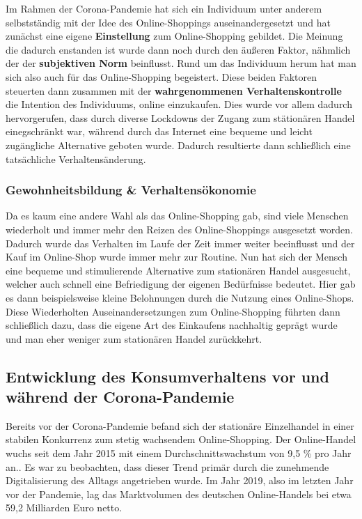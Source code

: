 Im Rahmen der Corona-Pandemie hat sich ein Individuum unter anderem selbstständig mit der Idee des Online-Shoppings auseinandergesetzt und hat zunächst eine eigene \textbf{Einstellung} zum Online-Shopping gebildet. Die Meinung die dadurch enstanden ist wurde dann noch durch den äußeren Faktor, nähmlich der der \textbf{subjektiven Norm} beinflusst. Rund um das Individuum herum hat man sich also auch für das Online-Shopping begeistert. Diese beiden Faktoren steuerten dann zusammen mit der \textbf{wahrgenommenen Verhaltenskontrolle} die Intention des Individuums, online einzukaufen. Dies wurde vor allem dadurch hervorgerufen, dass durch diverse Lockdowns der Zugang zum stätionären Handel einegschränkt war, während durch das Internet eine bequeme und leicht zugängliche Alternative geboten wurde. Dadurch resultierte dann schließlich eine tatsächliche Verhaltensänderung.

\subsubsection{Gewohnheitsbildung \& Verhaltensökonomie}
Da es kaum eine andere Wahl als das Online-Shopping gab, sind viele Menschen wiederholt und immer mehr den Reizen des Online-Shoppings ausgesetzt worden. Dadurch wurde das Verhalten im Laufe der Zeit immer weiter beeinflusst und der Kauf im Online-Shop wurde immer mehr zur Routine. Nun hat sich der Mensch eine bequeme und stimulierende Alternative zum stationären Handel ausgesucht, welcher auch schnell eine Befriedigung der eigenen Bedürfnisse bedeutet. Hier gab es dann beispielsweise kleine Belohnungen durch die Nutzung eines Online-Shops. Diese Wiederholten Auseinandersetzungen zum Online-Shopping führten dann schließlich dazu, dass die eigene Art des Einkaufens nachhaltig geprägt wurde und man eher weniger zum stationären Handel zurückkehrt. 

\subsection{Entwicklung des Konsumverhaltens vor und während der Corona-Pandemie}
Bereits vor der Corona-Pandemie befand sich der stationäre Einzelhandel in einer stabilen Konkurrenz zum stetig wachsendem Online-Shopping. Der Online-Handel wuchs seit dem Jahr 2015 mit einem Durchschnittswachstum von 9,5 \% pro Jahr an.. Es war zu beobachten, dass dieser Trend primär durch die zunehmende Digitalisierung des Alltags angetrieben wurde. Im Jahr 2019, also im letzten Jahr vor der Pandemie, lag das Marktvolumen des deutschen Online-Handels bei etwa 59,2 Milliarden Euro netto.

